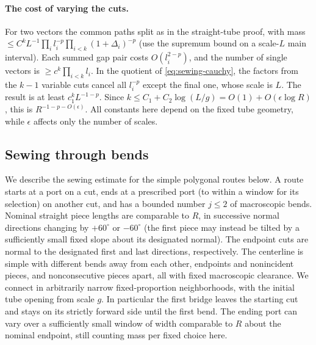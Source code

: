 \paragraph{The cost of varying the cuts.}
For two vectors the common paths split as in the straight-tube proof, with mass \(\le C^k L^{-1}\prod_i l_i^{-p}\prod_{i<k}(1+\Delta_i)^{-p}\) (use the supremum bound on a scale-\(L\) main interval). Each summed gap pair costs \(O(l_i^{2-p})\), and the number of single vectors is \(\ge c^k\prod_{i<k}l_i\). In the quotient of \eqref{eq:sewing-cauchy}, the factors from the
\(k-1\) variable cuts cancel all \(l_i^{-p}\) except the final one,
whose scale is \(L\). The result is at least \(c_1^kL^{-1-p}\).
Since \(k\le C_1+C_2\log(L/g)=O(1)+O(\epsilon\log R)\), this is
\(R^{-1-p-O(\epsilon)}\). All constants here depend on the fixed tube
geometry, while \(\epsilon\) affects only the number of scales.

\subsection{Sewing through bends} We describe the sewing estimate for the simple polygonal routes below. A route starts at a port on a cut, ends at a prescribed port (to within a window for its selection) on another cut, and has a bounded number \(j\le2\) of macroscopic bends. Nominal straight piece lengths are comparable to \(R\), in successive normal directions changing by \(+60^\circ\) or \(-60^\circ\) (the first piece may instead be tilted by a sufficiently small fixed slope about its designated normal). The endpoint cuts are normal to the designated first and last directions, respectively. The centerline is simple with different bends away from each other, endpoints and nonincident pieces, and nonconsecutive pieces apart, all with fixed macroscopic clearance. We connect in arbitrarily narrow fixed-proportion neighborhoods, with the initial tube opening from scale \(g\). In particular the first bridge leaves the starting cut and stays on its strictly forward side until the first bend. The ending port can vary over a sufficiently small window of width comparable to \(R\) about the nominal endpoint, still counting mass per fixed choice here.

